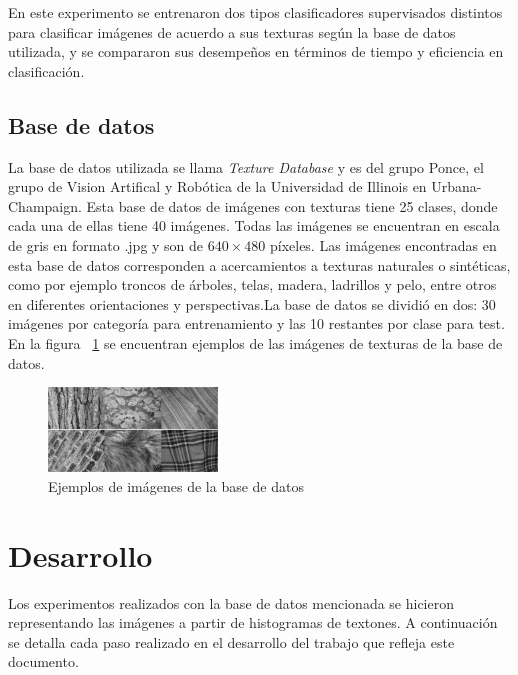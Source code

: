 \documentclass[10pt,twocolumn,letterpaper]{article}
\begin{document}
En este experimento se entrenaron dos tipos clasificadores supervisados distintos para clasificar imágenes de acuerdo a sus texturas según la base de datos utilizada, y se compararon sus desempeños en términos de tiempo y eficiencia en clasificación.

\subsection{Base de datos \cite{Base}} 
La base de datos utilizada se llama \textit{Texture Database} y es del grupo Ponce, el grupo de Vision Artifical y Robótica de la Universidad de Illinois en Urbana-Champaign. Esta base de datos de imágenes con texturas tiene 25 clases, donde cada una de ellas tiene 40 imágenes. Todas las imágenes se encuentran en escala de gris en formato .jpg y son de \(640\times480\) píxeles. Las imágenes encontradas en esta base de datos corresponden a acercamientos a texturas naturales o sintéticas, como por ejemplo troncos de árboles, telas, madera, ladrillos y pelo, entre otros en diferentes orientaciones y perspectivas.La base de datos se dividió en dos: 30 imágenes por categoría para entrenamiento y las 10 restantes por clase para test. En la figura ~\ref{fig:ejemplos texturas} se encuentran ejemplos de las imágenes de texturas de la base de datos.

\begin{figure}[h]
    \centering
    \includegraphics[width=0.4\textwidth]{EjemplosTexturas.jpg}
    \caption{Ejemplos de imágenes de la base de datos}
    \label{fig:ejemplos texturas}
\end{figure}

\section{Desarrollo}
Los experimentos realizados con la base de datos mencionada se hicieron representando las imágenes a partir de histogramas de textones. A continuación se detalla cada paso realizado en el desarrollo del trabajo que refleja este documento.
\end{document}
